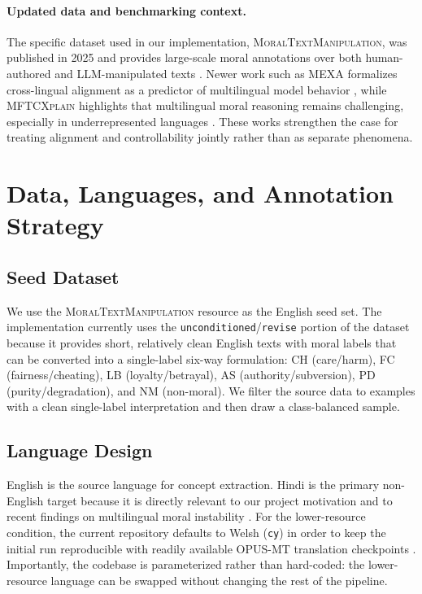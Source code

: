 \documentclass[11pt]{article}
\begin{document}
\paragraph{Updated data and benchmarking context.}
The specific dataset used in our implementation, \textsc{MoralTextManipulation}, was published in 2025 and provides large-scale moral annotations over both human-authored and LLM-manipulated texts \citep{greco2025moraltext}. Newer work such as \textsc{MEXA} formalizes cross-lingual alignment as a predictor of multilingual model behavior \citep{kargaran2025mexa}, while \textsc{MFTCXplain} highlights that multilingual moral reasoning remains challenging, especially in underrepresented languages \citep{trager2025mftcxplain}. These works strengthen the case for treating alignment and controllability jointly rather than as separate phenomena.

\section{Data, Languages, and Annotation Strategy}
\subsection{Seed Dataset}
We use the \textsc{MoralTextManipulation} resource \citep{greco2025moraltext} as the English seed set. The implementation currently uses the \texttt{unconditioned}/\texttt{revise} portion of the dataset because it provides short, relatively clean English texts with moral labels that can be converted into a single-label six-way formulation: \textsc{CH} (care/harm), \textsc{FC} (fairness/cheating), \textsc{LB} (loyalty/betrayal), \textsc{AS} (authority/subversion), \textsc{PD} (purity/degradation), and \textsc{NM} (non-moral). We filter the source data to examples with a clean single-label interpretation and then draw a class-balanced sample.

\subsection{Language Design}
English is the source language for concept extraction. Hindi is the primary non-English target because it is directly relevant to our project motivation and to recent findings on multilingual moral instability \citep{agarwal2024ethical,khandelwal2024dit}. For the lower-resource condition, the current repository defaults to Welsh (\texttt{cy}) in order to keep the initial run reproducible with readily available OPUS-MT translation checkpoints \citep{tiedemann2020opusmt}. Importantly, the codebase is parameterized rather than hard-coded: the lower-resource language can be swapped without changing the rest of the pipeline.
\end{document}
